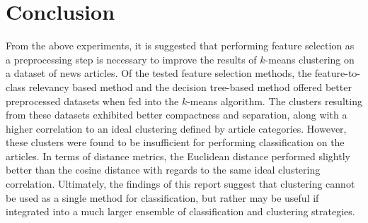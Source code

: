 \documentclass[11pt]{article}
\begin{document}
\section{Conclusion}

From the above experiments, it is suggested that performing feature selection as a preprocessing step is necessary to improve the results of $k$-means clustering on a dataset of news articles.
Of the tested feature selection methods, the feature-to-class relevancy based method and the decision tree-based method offered better preprocessed datasets when fed into the $k$-means algorithm.
The clusters resulting from these datasets exhibited better compactness and separation, along with a higher correlation to an ideal clustering defined by article categories.
However, these clusters were found to be insufficient for performing classification on the articles.
In terms of distance metrics, the Euclidean distance performed slightly better than the cosine distance with regards to the same ideal clustering correlation.
Ultimately, the findings of this report suggest that clustering cannot be used as a single method for classification, but rather may be useful if integrated into a much larger ensemble of classification and clustering strategies.

{}

\end{document}
